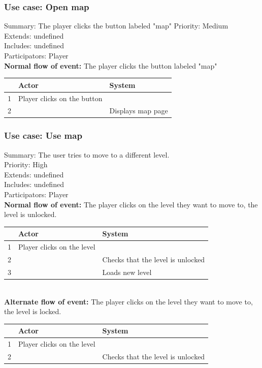 \documentclass{article}
\begin{document}
\subsubsection{Use case: Open map}
Summary: The player clicks the button labeled "map"
Priority: Medium \\
Extends: undefined\\
Includes: undefined\\
Participators: Player \\
\textbf{Normal flow of event:} The player clicks the button labeled "map"\\
\begin{tabular}{|c|l|l|} \hline
      & Actor & System \\ \hline
    1 & Player clicks on the button & \\ \hline
    2 & & Displays map page \\ \hline
\end{tabular} 

\subsubsection{Use case: Use map}
Summary: The user tries to move to a different level.\\
Priority: High\\
Extends: undefined\\
Includes: undefined\\
Participators: Player \\
\textbf{Normal flow of event:} The player clicks on the level they want to move to, the level is unlocked.\\
\begin{tabular}{|c|l|l|} \hline
      & Actor & System \\ \hline
    1 & Player clicks on the level & \\ \hline
    2 & & Checks that the level is unlocked \\ \hline
    3 & & Loads new level \\ \hline
\end{tabular} \\
\textbf{Alternate flow of event:} The player clicks on the level they want to move to, the level is locked.
\vspace{1 mm}\\
\begin{tabular}{|c|l|l|} \hline
      & Actor & System \\ \hline
    1 & Player clicks on the level & \\ \hline
    2 & & Checks that the level is unlocked \\ \hline
\end{tabular} 
\end{document}
